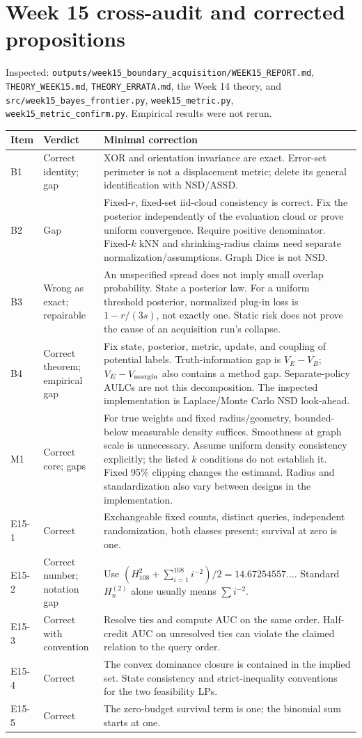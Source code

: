 \documentclass[11pt]{article}
\theoremstyle{definition}
\newcommand{\1}{\mathbf 1}
\begin{document}
\section{Week 15 cross-audit and corrected propositions}
Inspected: \texttt{outputs/week15\_boundary\_acquisition/WEEK15\_REPORT.md},
\texttt{THEORY\_WEEK15.md}, \texttt{THEORY\_ERRATA.md}, the Week 14 theory,
and \texttt{src/week15\_bayes\_frontier.py}, \texttt{week15\_metric.py},
\texttt{week15\_metric\_confirm.py}. Empirical results were not rerun.
\small
\begin{longtable}{p{}p{}p{}}
\toprule Item & Verdict & Minimal correction\\\midrule\endhead
B1 & Correct identity; gap &
XOR and orientation invariance are exact. Error-set perimeter is not a
displacement metric; delete its general identification with NSD/ASSD.\\
B2 & Gap &
Fixed-$r$, fixed-set iid-cloud consistency is correct. Fix the posterior
independently of the evaluation cloud or prove uniform convergence.
Require positive denominator. Fixed-$k$ kNN and shrinking-radius claims
need separate normalization/assumptions. Graph Dice is not NSD.\\
B3 & Wrong as exact; repairable &
An unspecified spread does not imply small overlap probability. State a
posterior law. For a uniform threshold posterior, normalized plug-in loss
is $1-r/(3s)$, not exactly one. Static risk does not prove the cause of
an acquisition run's collapse.\\
B4 & Correct theorem; empirical gap &
Fix state, posterior, metric, update, and coupling of potential labels.
Truth-information gap is $V_E-V_B$; $V_E-V_{\rm margin}$ also contains a
method gap. Separate-policy AULCs are not this decomposition.
The inspected implementation is Laplace/Monte Carlo NSD look-ahead.\\
M1 & Correct core; gaps &
For true weights and fixed radius/geometry, bounded-below measurable density
suffices. Smoothness at graph scale is unnecessary. Assume uniform density
consistency explicitly; the listed $k$ conditions do not establish it.
Fixed 95\% clipping changes the estimand. Radius and standardization also
vary between designs in the implementation.\\
E15-1 & Correct &
Exchangeable fixed counts, distinct queries, independent randomization,
both classes present; survival at zero is one.\\
E15-2 & Correct number; notation gap &
Use $(H_{108}^2+\sum_{i=1}^{108}i^{-2})/2=14.67254557\ldots$.
Standard $H_n^{(2)}$ alone usually means $\sum i^{-2}$.\\
E15-3 & Correct with convention &
Resolve ties and compute AUC on the same order. Half-credit AUC on unresolved
ties can violate the claimed relation to the query order.\\
E15-4 & Correct &
The convex dominance closure is contained in the implied set. State
consistency and strict-inequality conventions for the two feasibility LPs.\\
E15-5 & Correct &
The zero-budget survival term is one; the binomial sum starts at one.\\
\bottomrule
\end{longtable}
\end{document}
